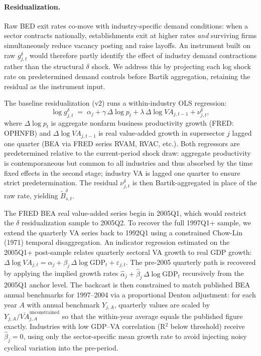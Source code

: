 \documentclass[authoryear, review, 12pt]{elsarticle}
\begin{document}
	\paragraph{Residualization.}
	Raw BED exit rates co-move with industry-specific demand conditions:
	when a sector contracts nationally, establishments exit at higher rates
	\emph{and} surviving firms simultaneously reduce vacancy posting and
	raise layoffs.  An instrument built on raw $g^\delta_{j,t}$ would
	therefore partly identify the effect of industry demand contractions
	rather than the structural $\delta$ shock.  We address this by
	projecting each log shock rate on predetermined demand controls before
	Bartik aggregation, retaining the residual as the instrument input.

	The baseline residualization (v2) runs a within-industry OLS regression:
	\begin{equation}\label{eq:resid_v2}
		\log g^{\delta}_{j,t}
		\;=\;
		\alpha_j + \gamma\,\Delta\!\log p_t
		         + \lambda\,\Delta\!\log VA_{j,t-1}
		         + \nu^{\delta}_{j,t},
	\end{equation}
	where $\Delta\!\log p_t$ is aggregate nonfarm business productivity
	growth (FRED: OPHNFB) and $\Delta\!\log VA_{j,t-1}$ is real
	value-added growth in supersector $j$ lagged one quarter (BEA via
	FRED series RVAM, RVAC, etc.).  Both regressors are predetermined
	relative to the current-period shock draw: aggregate productivity is
	contemporaneous but common to all industries and thus absorbed by the
	time fixed effects in the second stage; industry VA is lagged one
	quarter to ensure strict predetermination.  The residual
	$\nu^{\delta}_{j,t}$ is then Bartik-aggregated in place of the raw
	rate, yielding $\tilde{B}^{\delta}_{s,t}$.

	The FRED BEA real value-added series begin in 2005Q1, which would
	restrict the $\delta$ residualization sample to 2005Q2.  To recover
	the full 1997Q1+ sample, we extend the quarterly VA series back to
	1992Q1 using a constrained Chow-Lin (1971) temporal disaggregation.
	An indicator regression estimated on the 2005Q1+ post-sample relates
	quarterly sectoral VA growth to real GDP growth:
	$\Delta\!\log VA_{j,t}=\alpha_j+\beta_j\,\Delta\!\log\text{GDP}_t+\varepsilon_{j,t}$.
	The pre-2005 quarterly path is recovered by applying the implied
	growth rates $\hat{\alpha}_j+\hat{\beta}_j\,\Delta\!\log\text{GDP}_t$
	recursively from the 2005Q1 anchor level.  The backcast is then
	constrained to match published BEA annual benchmarks for 1997--2004
	via a proportional Denton adjustment: for each year $A$ with annual
	benchmark $Y_{j,A}$, quarterly values are scaled by
	$Y_{j,A}/\overline{VA}_{j,A}^{\text{unconstrained}}$ so that the
	within-year average equals the published figure exactly.  Industries
	with low GDP--VA correlation (R$^2$ below threshold) receive
	$\hat{\beta}_j=0$, using only the sector-specific mean growth rate to
	avoid injecting noisy cyclical variation into the pre-period.
\end{document}
